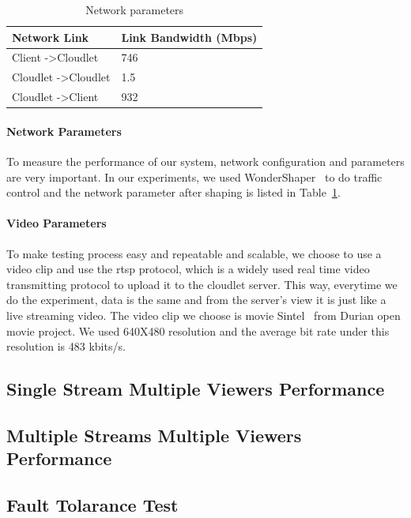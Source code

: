 \documentclass[letterpaper,twocolumn,10pt]{article}
\begin{document}
\begin{table}[h]
\begin{tabular}{|l|l|}
\hline
Network Link & Link Bandwidth (Mbps) \\ \hline
Client -\textgreater Cloudlet & 746 \\ \hline
Cloudlet -\textgreater Cloudlet & 1.5 \\ \hline
Cloudlet -\textgreater Client & 932 \\ \hline
\end{tabular}
\caption{Network parameters}
\label{table:network}
\end{table}

\paragraph{Network Parameters}
To measure the performance of our system, network configuration and parameters are very important. In our experiments, we used WonderShaper~\cite{wondershaper} to do traffic control and the network parameter after shaping is listed in Table~\ref{table:network}.

\paragraph{Video Parameters}
To make testing process easy and repeatable and scalable, we choose to use a video clip and use the rtsp protocol, which is a widely used real time video transmitting protocol to upload it to the cloudlet server. This way, everytime we do the experiment, data is the same and from the server's view it is just like a live streaming video. The video clip we choose is movie Sintel~\cite{sintel} from Durian open movie project. We used 640X480 resolution and the average bit rate under this resolution is 483 kbits/s.

\subsection{Single Stream Multiple Viewers Performance}
\subsection{Multiple Streams Multiple Viewers Performance}
\subsection{Fault Tolarance Test}
\end{document}

